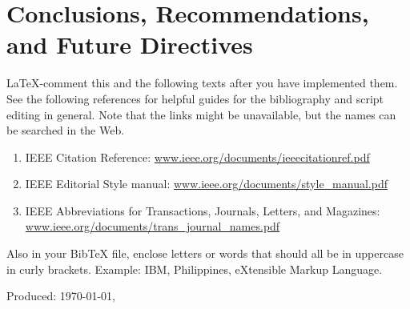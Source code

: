 \ifConc
	\chapter{Conclusions, Recommendations, and Future Directives} 
	\label{ch:conc} 
	\startcontents[chapters]
	\begin{SingleSpace}	
		\Mprintcontents 
	\end{SingleSpace}
	
	\stopcontents[chapters]
	\cleardoublepage
\fi

\renewcommand{\UrlFont}{\normalfont}
\begin{SingleSpace}
  {\small }
	\vfill
	\LaTeX-comment this and the following texts after you have implemented them. See the following references for helpful guides for the bibliography and script editing in general.  Note that the links might be unavailable, but the names can be searched in the Web.
		
	\begin{enumerate}
		\item IEEE Citation Reference: \url{www.ieee.org/documents/ieeecitationref.pdf}
		
		\item IEEE Editorial Style manual: \url{www.ieee.org/documents/style_manual.pdf} 
		
		\item IEEE Abbreviations for Transactions, Journals, Letters, and Magazines: \url{www.ieee.org/documents/trans_journal_names.pdf}
	\end{enumerate}
	
\noindent Also in your BibTeX file, enclose letters or words that should all be in uppercase in curly brackets. Example: {IBM}, {P}hilippines, e{X}tensible {M}arkup {L}anguage.

\end{SingleSpace}
\vfill
\begin{flushright}
Produced: \usdate\today, \currenttime \\
\end{flushright}
\cleardoublepage 

\SingleSpacing
\appendix
\renewcommand{\thechapter}{\Alph{chapter}}
\renewcommand{\thesection}{\thechapter\arabic{section}}
\appto\appendix{\renewcommand\thechapter{\AlphAlph{\value{chapter}}}} %
